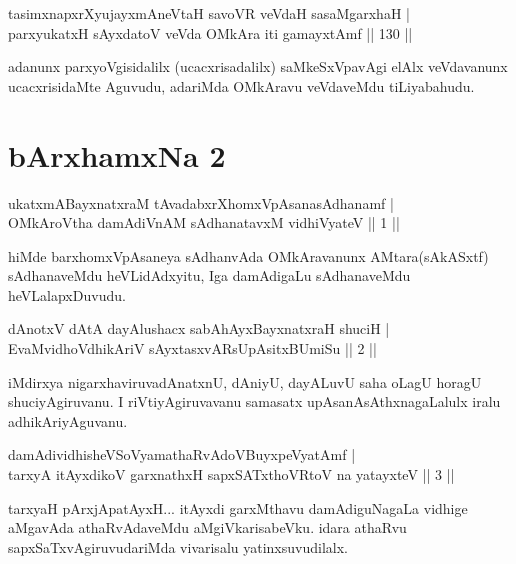 \begin{shl}
tasimxnapxrXyujayxmAneV\s taH savoVR veVdaH sasaMgarxhaH   | \\
 parxyukatxH sAyxdatoV veVda OMkAra iti gamayxtAmf \hfill||  130 ||  
\end{shl}

\begin{artha}
adanunx parxyoVgisidalilx (ucacxrisadalilx) saMkeSxVpavAgi elAlx veVdavanunx ucacxrisidaMte Aguvudu, adariMda OMkAravu veVdaveMdu tiLiyabahudu.
\end{artha}

\centerline{}

\section*{bArxhamxNa 2}

\begin{shl}
ukatxmABayxnatxraM tAvadabxrXhomxVpAsanasAdhanamf | \\
OMkAroV\s tha damAdiVnAM sAdhanatavxM vidhiVyateV \hfill||  1 || 
\end{shl}

\begin{artha}
hiMde barxhomxVpAsaneya sAdhanvAda OMkAravanunx AMtara(sAkASxtf) sAdhanaveMdu heVLidAdxyitu, Iga damAdigaLu sAdhanaveMdu heVLalapxDuvudu. 
\end{artha}


\begin{shl}
dAnotxV dAtA dayAlushacx sabAhAyxBayxnatxraH shuciH | \\
EvaMvidhoV\s dhikAriV sAyxtasxvARsUpAsitxBUmiSu \hfill||  2 ||
\end{shl}

\begin{artha}
iMdirxya nigarxhaviruvadAnatxnU, dAniyU, dayALuvU saha oLagU  horagU shuciyAgiruvanu. I riVtiyAgiruvavanu samasatx upAsanAsAthxnagaLalulx iralu adhikAriyAguvanu.
\end{artha}

\begin{shl}
damAdividhisheVSoV\s yamathaRvAdoV\s BuyxpeVyatAmf  | \\
 tarxyA itAyxdikoV garxnathxH sapxSATxthoVR\s toV na yatayxteV ||  3 || 
\end{shl}

\begin{artha}
tarxyaH pArxjApatAyxH... itAyxdi garxMthavu damAdiguNagaLa vidhige aMgavAda athaRvAdaveMdu aMgiVkarisabeVku. idara athaRvu sapxSaTxvAgiruvudariMda vivarisalu yatinxsuvudilalx.
\end{artha}

